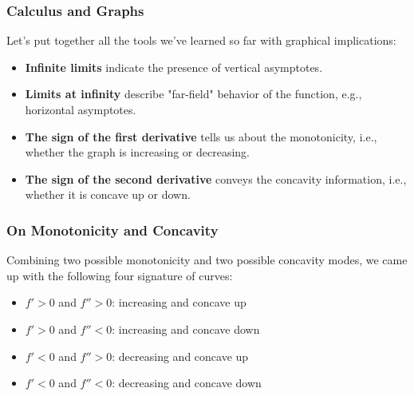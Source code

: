 \documentclass[10pt,t,handout,ignorenonframetext,aspectratio=169]{beamer}
\title[\course]{\lecTitle}
\institute[Ohio State]
{
  \medskip
}
\date[\week]{\semester}
\author{Tae Eun Kim, Ph.D.}
\begin{document}
\begin{frame}
  \titlepage
\end{frame}

\begin{frame}
  \frametitle{Calculus and Graphs}
  Let's put together all the tools we've learned so far with graphical
  implications:
  \begin{itemize}
  \item \textbf{Infinite limits} indicate the presence of vertical asymptotes.
  \item \textbf{Limits at infinity} describe "far-field" behavior of the function, e.g., horizontal asymptotes.
  \item \textbf{The sign of the first derivative} tells us about the monotonicity, i.e., whether the graph is increasing or decreasing.
  \item \textbf{The sign of the second derivative} conveys the concavity information, i.e., whether it is concave up or down.
  \end{itemize}
\end{frame}

\begin{frame}
  \frametitle{On Monotonicity and Concavity}
  Combining two possible monotonicity and two possible concavity
  modes, we came up with the following four signature of curves:
  \begin{itemize}
  \item $f'>0$ and $f''>0$: increasing and concave up
  \item $f'>0$ and $f''<0$: increasing and concave down
  \item $f'<0$ and $f''>0$: decreasing and concave up
  \item $f'<0$ and $f''<0$: decreasing and concave down
  \end{itemize}
\end{frame}
\end{document}
